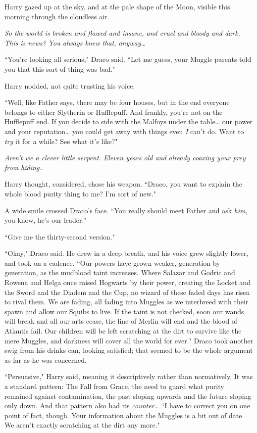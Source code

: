 Harry gazed up at the sky, and at the pale shape of the Moon, visible this morning through the cloudless air.

\emph{So the world is broken and flawed and insane, and cruel and bloody and dark. This is news? You always knew that, anyway{\ldots}}

``You're looking all serious," Draco said. ``Let me guess, your Muggle parents told you that this sort of thing was bad."

Harry nodded, not quite trusting his voice.

``Well, like Father says, there may be four houses, but in the end everyone belongs to either Slytherin or Hufflepuff. And frankly, you're not on the Hufflepuff end. If you decide to side with the Malfoys under the table{\ldots} our power and your reputation{\ldots} you could get away with things even \emph{I} can't do. Want to \emph{try} it for a while? See what it's like?"

\emph{Aren't we a clever little serpent. Eleven years old and already coaxing your prey from hiding{\ldots}}

Harry thought, considered, chose his weapon. ``Draco, you want to explain the whole blood purity thing to me? I'm sort of new."

A wide smile crossed Draco's face. ``You really should meet Father and ask \emph{him}, you know, he's our leader."

``Give me the thirty-second version."

``Okay," Draco said. He drew in a deep breath, and his voice grew slightly lower, and took on a cadence. ``Our powers have grown weaker, generation by generation, as the mudblood taint increases. Where Salazar and Godric and Rowena and Helga once raised Hogwarts by their power, creating the Locket and the Sword and the Diadem and the Cup, no wizard of these faded days has risen to rival them. We are fading, all fading into Muggles as we interbreed with their spawn and allow our Squibs to live. If the taint is not checked, soon our wands will break and all our arts cease, the line of Merlin will end and the blood of Atlantis fail. Our children will be left scratching at the dirt to survive like the mere Muggles, and darkness will cover all the world for ever." Draco took another swig from his drinks can, looking satisfied; that seemed to be the whole argument as far as he was concerned.

``Persuasive," Harry said, meaning it descriptively rather than normatively. It was a standard pattern: The Fall from Grace, the need to guard what purity remained against contamination, the past sloping upwards and the future sloping only down. And that pattern also had its \emph{counter}{\ldots} ``I have to correct you on one point of fact, though. Your information about the Muggles is a bit out of date. We aren't exactly scratching at the dirt any more."

